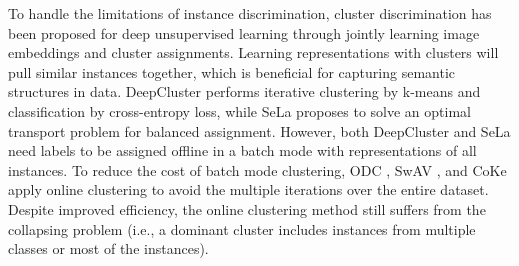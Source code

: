 \documentclass{article} \usepackage{iclr2023_conference,times}
\begin{document}
To handle the limitations of instance discrimination, cluster discrimination has been proposed for deep unsupervised learning through jointly learning image embeddings and cluster assignments. 
Learning representations with clusters will pull similar instances together, which is beneficial for capturing semantic structures in data. DeepCluster \citep{caron2018deep} performs iterative clustering by k-means and classification by cross-entropy loss, while SeLa \citep{asano2019self} proposes to solve an optimal transport problem for balanced assignment. However, both DeepCluster and SeLa need labels to be assigned offline in a batch mode with representations of all instances. To reduce the cost of batch mode clustering, ODC \citep{zhan2020online}, SwAV \citep{caron2020unsupervised}, and CoKe \citep{qian2022unsupervised} apply online clustering to avoid the multiple iterations over the entire dataset. 
Despite improved efficiency, the online clustering method still suffers from the collapsing problem (i.e., a dominant cluster includes instances from multiple classes or most of the instances).
\end{document}
